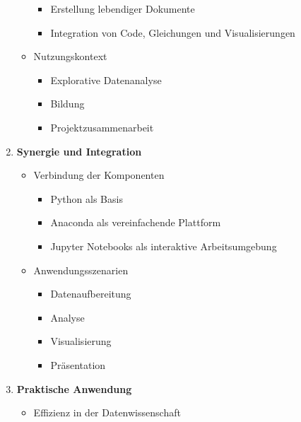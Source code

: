 \documentclass{vorlage-design-main}
\begin{document}
\begin{enumerate}
\begin{itemize}
    \begin{itemize}

    \item
      Erstellung lebendiger Dokumente
    \item
      Integration von Code, Gleichungen und Visualisierungen
    \end{itemize}
  \item
    Nutzungskontext

    \begin{itemize}

    \item
      Explorative Datenanalyse
    \item
      Bildung
    \item
      Projektzusammenarbeit
    \end{itemize}
  \end{itemize}
\item
  \textbf{Synergie und Integration}

  \begin{itemize}

  \item
    Verbindung der Komponenten

    \begin{itemize}

    \item
      Python als Basis
    \item
      Anaconda als vereinfachende Plattform
    \item
      Jupyter Notebooks als interaktive Arbeitsumgebung
    \end{itemize}
  \item
    Anwendungsszenarien

    \begin{itemize}

    \item
      Datenaufbereitung
    \item
      Analyse
    \item
      Visualisierung
    \item
      Präsentation
    \end{itemize}
  \end{itemize}
\item
  \textbf{Praktische Anwendung}

  \begin{itemize}

  \item
    Effizienz in der Datenwissenschaft


\end{itemize}
\end{enumerate}
\end{document}
